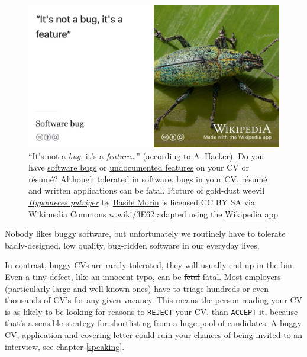 \documentclass[
]{book}
\begin{document}
\begin{figure}

{\centering \includegraphics[width=0.99\linewidth]{images/notabug} 

}

\caption{``It's not a \emph{bug}, it's a \emph{feature}\ldots{}'' (according to A. Hacker). Do you have \href{https://en.wikipedia.org/wiki/Software_bug}{software bugs} or \href{https://en.wikipedia.org/wiki/Undocumented_feature}{undocumented features} on your CV or résumé? Although tolerated in software, bugs in your CV, résumé and written applications can be fatal. Picture of gold-dust weevil \emph{\href{https://en.wikipedia.org/wiki/Hypomeces_pulviger}{Hypomeces pulviger}} by \href{https://commons.wikimedia.org/wiki/User:Basile_Morin}{Basile Morin} is licensed CC BY SA via Wikimedia Commons \href{https://w.wiki/3E62}{w.wiki/3E62} adapted using the \href{https://apps.apple.com/us/app/wikipedia/id324715238}{Wikipedia app}}\label{fig:notabug-fig}
\end{figure}



Nobody likes buggy software, but unfortunately we routinely have to tolerate badly-designed, low quality, bug-ridden software in our everyday lives. \citep{badsoftware, failware}

In contrast, buggy CVs are rarely tolerated, they will usually end up in the bin. Even a tiny defect, like an innocent typo, can be \sout{fetal} fatal. Most employers (particularly large and well known ones) have to triage hundreds or even thousands of CV's for any given vacancy. This means the person reading your CV is as likely to be looking for reasons to \texttt{REJECT} your CV, than \texttt{ACCEPT} it, because that's a sensible strategy for shortlisting from a huge pool of candidates. A buggy CV, application and covering letter could ruin your chances of being invited to an interview, see chapter \ref{speaking}.
\end{document}
